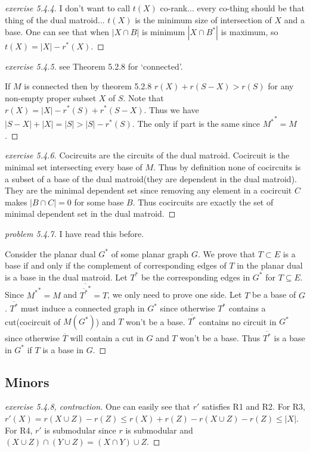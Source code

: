 \documentclass[12pt]{article}
\begin{document}
\begin{proof}[exercise 5.4.4]
    I don't want to call $t(X)$ co-rank... every co-thing should be that thing of the dual matroid... $t(X)$ is the minimum size of intersection of $X$ and a base. One can see that when $|X\cap B|$ is minimum $|X\cap B^*|$ is maximum, so $t(X)=|X|-r^*(X)$.
\end{proof}
\begin{proof}[exercise 5.4.5]
    see Theorem 5.2.8 for `connected'.

    If $M$ is connected then by theorem 5.2.8 $r(X)+r(S-X)> r(S)$ for any non-empty proper subset $X$ of $S$. Note that $r(X)=|X|-r^*(S)+r^*(S-X)$. Thus we have $|S-X|+|X|=|S|>|S|-r^*(S)$. The only if part is the same since ${M^*}^*=M$.
\end{proof}
\begin{proof}[exercise 5.4.6]
    Cocircuits are the circuits of the dual matroid. Cocircuit is the minimal set intersecting every base of $M$. Thus by definition none of cocircuits is a subset of a base of the dual matroid(they are dependent in the dual matroid). They are the minimal dependent set since removing any element in a cocircuit $C$ makes $|B\cap C|=0$ for some base $B$. Thus cocircuits are exactly the set of minimal dependent set in the dual matroid.
\end{proof}
\begin{proof}[problem 5.4.7]
    I have read this before.

    Consider the planar dual $G^*$ of some planar graph $G$. We prove that $T\subset E$ is a base if and only if the complement of corresponding edges of $T$ in the planar dual is a base in the dual matroid. Let $T^*$ be the corresponding edges in $G^*$ for $T\subseteq E$. Since ${M^*}^*=M$ and $\overline{\overline{T^*}^*}=T$, we only need to prove one side. Let $T$ be a base of $G$. $\overline{T^*}$ must induce a connected graph in $G^*$ since otherwise $T^*$ contains a cut(cocircuit of $M(G^*)$) and $T$ won't be a base. $\overline{T^*}$ contains no circuit in $G^*$ since otherwise $\overline{T}$ will contain a cut in $G$ and $T$ won't be a base. Thus $\overline{T^*}$ is a base in $G^*$ if $T$ is a base in $G$.
\end{proof}
\subsection{Minors}
\begin{proof}[exercise 5.4.8, contraction]
    One can easily see that $r'$ satisfies R1 and R2. For R3, $r'(X)=r(X\cup Z)-r(Z)\leq r(X)+r(Z)-r(X\cup Z)-r(Z)\leq |X|$. For R4, $r'$ is submodular since $r$ is submodular and $(X\cup Z) \cap (Y\cup Z)=(X\cap Y)\cup Z$.
\end{proof}
\end{document}
